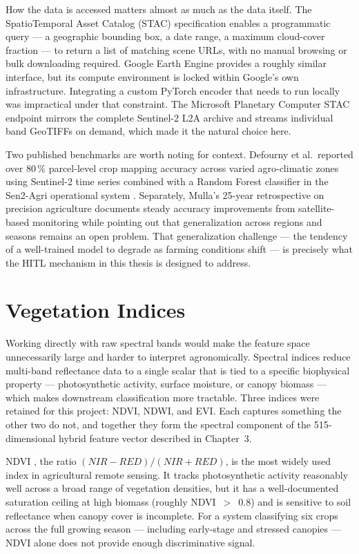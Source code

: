 \documentclass[12pt,a4paper,oneside]{report}
\begin{document}
How the data is accessed matters almost as much as the data itself. The SpatioTemporal Asset Catalog (STAC) specification \cite{lewis2021stac} enables a programmatic query — a geographic bounding box, a date range, a maximum cloud-cover fraction — to return a list of matching scene URLs, with no manual browsing or bulk downloading required. Google Earth Engine \cite{gorelick2017gee} provides a roughly similar interface, but its compute environment is locked within Google's own infrastructure. Integrating a custom PyTorch encoder that needs to run locally was impractical under that constraint. The Microsoft Planetary Computer STAC endpoint mirrors the complete Sentinel-2 L2A archive and streams individual band GeoTIFFs on demand, which made it the natural choice here.

Two published benchmarks are worth noting for context. Defourny et al.\ reported over 80\,\% parcel-level crop mapping accuracy across varied agro-climatic zones using Sentinel-2 time series combined with a Random Forest classifier in the Sen2-Agri operational system \cite{defourny2019near}. Separately, Mulla's 25-year retrospective on precision agriculture \cite{mulla2013twenty} documents steady accuracy improvements from satellite-based monitoring while pointing out that generalization across regions and seasons remains an open problem. That generalization challenge — the tendency of a well-trained model to degrade as farming conditions shift — is precisely what the HITL mechanism in this thesis is designed to address.

\section{Vegetation Indices}

Working directly with raw spectral bands would make the feature space unnecessarily large and harder to interpret agronomically. Spectral indices reduce multi-band reflectance data to a single scalar that is tied to a specific biophysical property — photosynthetic activity, surface moisture, or canopy biomass — which makes downstream classification more tractable. Three indices were retained for this project: NDVI, NDWI, and EVI. Each captures something the other two do not, and together they form the spectral component of the 515-dimensional hybrid feature vector described in Chapter~3.

NDVI \cite{rouse1974monitoring, tucker1979red}, the ratio $(NIR - RED)/(NIR + RED)$,
is the most widely used index in agricultural remote sensing. It tracks photosynthetic
activity reasonably well across a broad range of vegetation densities, but it has a
well-documented saturation ceiling at high biomass (roughly NDVI~$>$~0.8) and is
sensitive to soil reflectance when canopy cover is incomplete. For a system classifying
six crops across the full growing season — including early-stage and stressed canopies —
NDVI alone does not provide enough discriminative signal.
\end{document}
